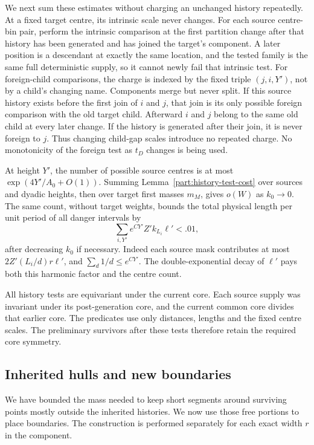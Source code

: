 We next sum these estimates without charging an unchanged history
repeatedly.  At a fixed target centre, its intrinsic scale never
changes.  For each source centre-bin pair, perform the intrinsic
comparison at the first partition change after that history has
been generated and has joined the target's component.  A later
position is a descendant at exactly the same location, and the
tested family is the same full deterministic supply, so it cannot
newly fail that intrinsic test.  For foreign-child comparisons,
the charge is indexed by the fixed triple $(j,i,Y')$, not by a
child's changing name.  Components merge but never split.  If this
source history exists before the first join of $i$ and $j$, that
join is its only possible foreign comparison with the old target
child.  Afterward $i$ and $j$ belong to the same old child at every
later change.  If the history is generated after their join, it is
never foreign to $j$.  Thus changing child-gap scales introduce no
repeated charge.  No monotonicity of the foreign test as $t_D$
changes is being used.

At height $Y'$, the number of possible source centres is at most
$\exp(4Y'/A_0+O(1))$.  Summing
Lemma~\ref{part:history-test-cost} over sources and dyadic heights,
then over target first masses $m_M$, gives $o(W)$ as $k_0\to0$.
The same count, without target weights, bounds the total physical
length per unit period of all danger intervals by
\begin{equation}
 \sum_{i,Y'} e^{CY'}Z'k_{L_i}\ell'<.01,
\label{part:global-danger-length}
\end{equation}
after decreasing $k_0$ if necessary.  Indeed each source mask
contributes at most $2Z'(L_i/d)r\ell'$, and
$\sum_d1/d\le e^{CY'}$.  The double-exponential decay of $\ell'$
pays both this harmonic factor and the centre count.

All history tests are equivariant under the current core.  Each
source supply was invariant under its post-generation core, and
the current common core divides that earlier core.  The predicates
use only distances, lengths and the fixed centre scales.  The
preliminary survivors after these tests therefore retain the
required core symmetry.

\subsection{Inherited hulls and new boundaries}

We have bounded the mass needed to keep short segments around
surviving points mostly outside the inherited histories.  We now
use those free portions to place boundaries.  The construction is
performed separately for each exact width $r$ in the component.

